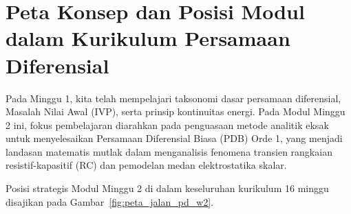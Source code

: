\documentclass[11pt,a4paper]{article}
\theoremstyle{definition}
\begin{document}
\newpage

\section{Peta Konsep dan Posisi Modul dalam Kurikulum Persamaan Diferensial}

Pada Minggu 1, kita telah mempelajari taksonomi dasar persamaan diferensial, Masalah Nilai Awal (IVP), serta prinsip kontinuitas energi. Pada Modul Minggu 2 ini, fokus pembelajaran diarahkan pada penguasaan metode analitik eksak untuk menyelesaikan Persamaan Diferensial Biasa (PDB) Orde 1, yang menjadi landasan matematis mutlak dalam menganalisis fenomena transien rangkaian resistif-kapasitif (RC) dan pemodelan medan elektrostatika skalar.

Posisi strategis Modul Minggu 2 di dalam keseluruhan kurikulum 16 minggu disajikan pada Gambar~\ref{fig:peta_jalan_pd_w2}.
\end{document}

